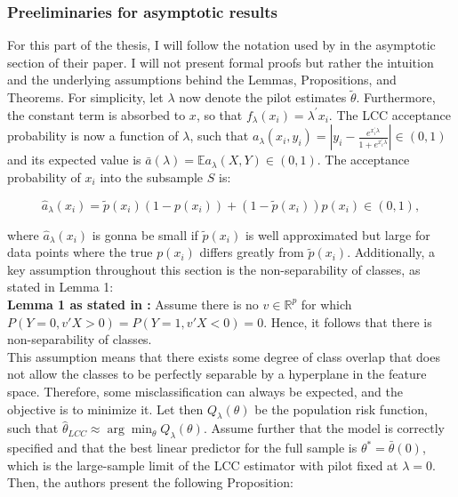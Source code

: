 \subsubsection{Preeliminaries for asymptotic results}

For this part of the thesis, I will follow the notation used by \textcite{hastie2014} in the asymptotic section of their paper. I will not present formal proofs but rather the intuition and the underlying assumptions behind the Lemmas, Propositions, and Theorems. For simplicity, let $\lambda$ now denote the pilot estimates $\tilde{\theta}$. Furthermore, the constant term is absorbed to $x$, so that $f_{\lambda} (x_i) = \lambda^{\prime} x_i$. The LCC acceptance probability is now a function of $\lambda$, such that $a_\lambda(x_i, y_i)=\left|y_i-\frac{e^{x_i^{\prime} \lambda}}{1 + e^{x_i^{\prime} \lambda}}\right| \in(0,1)$ and its expected value is $\bar{a}(\lambda) = \mathbb{E} a_{\lambda}(X, Y) \in (0,1)$. The acceptance probability of $x_i$ into the subsample $S$ is:

\begin{equation}
    \hat{a}_{\lambda}(x_i) = \tilde{p}(x_i)(1 - p(x_i)) + (1 - \tilde{p}(x_i))p(x_i) \in (0,1), 
\end{equation}

where $\hat{a}_{\lambda}(x_i)$ is gonna be small if $\tilde{p}(x_i)$ is well approximated but large for data points where the true $p(x_i)$ differs greatly from $\tilde{p}(x_i)$. Additionally, a key assumption throughout this section is the non-separability of classes, as stated in Lemma 1:\\

\textbf{Lemma 1 as stated in \textcite{hastie2014}:}
Assume there is no $v \in \mathbb{R}^p$ for which $P(Y=0, v \prime X>0) = P(Y=1, v \prime X<0) = 0$. Hence, it follows that there is non-separability of classes.\\

This assumption means that there exists some degree of class overlap that does not allow the classes to be perfectly separable by a hyperplane in the feature space. Therefore, some misclassification can always be expected, and the objective is to minimize it. Let then $Q_\lambda(\theta)$ be the population risk function, such that $\hat{\theta}_{LCC} \approx \arg \min_\theta Q_\lambda(\theta)$. Assume further that the model is correctly specified and that the best linear predictor for the full sample is $\theta^* = \bar{\theta}(0)$, which is the large-sample limit of the LCC estimator with pilot fixed at $\lambda = 0$. Then, the authors present the following Proposition: \\

